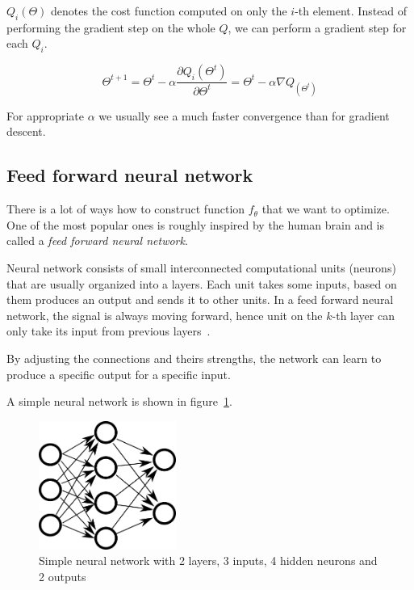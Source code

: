     $Q_i(\Theta)$ denotes the cost function computed on only the $i$-th element. 
    Instead of performing the gradient step on the whole $Q$, 
    we can perform a gradient step for each $Q_i$. 

    \begin{equation}
    \Theta^{t+1} = \Theta^t - \alpha \frac{\partial Q_i(\Theta^t)}{\partial \Theta^t} = \Theta^t - \alpha \nabla Q_(\Theta^t)
    \label{eq:stochastic:gradient:descent}
    \end{equation}
    
    For appropriate $\alpha$ we usually see a much faster convergence than for gradient descent.
    
    \subsection{Feed forward neural network}
    There is a lot of ways how to construct function $f_\theta$ that we want to optimize. 
    One of the most popular ones is roughly inspired by the human brain and is called a \textit{feed forward neural network}.
    
    Neural network consists of small interconnected computational units (neurons) that are usually organized into a layers.
    Each unit takes some inputs, based on them produces an output and sends it to other units. 
    In a feed forward neural network, the signal is always moving forward,
    hence unit on the $k$-th layer can only take its input from previous layers~\cite{Goodfellow-et-al-2016}.
    
    By adjusting the connections and theirs strengths, the network can learn to produce a specific output for a specific input.
    
    A simple neural network is shown in figure~\ref{obr:siet}.
    
    \begin{figure}[h]
    \centerline{\includegraphics[width=0.4\textwidth]{images/neural_network}}
    \caption[Simple neural network]{Simple neural network with 2 layers, 3 inputs, 4 hidden neurons and 2 outputs}
    \label{obr:siet}
    \end{figure}
    
